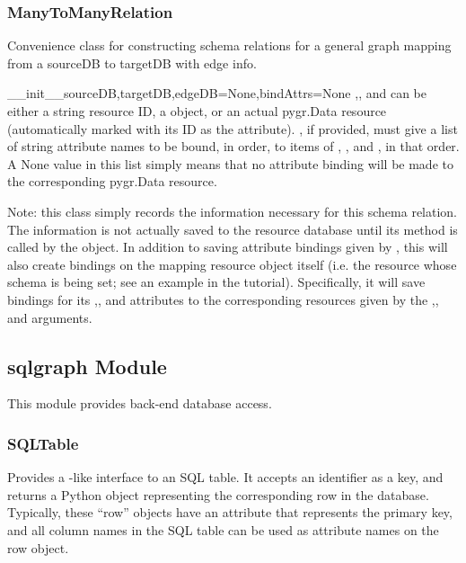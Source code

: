 \documentclass{howto}
\begin{document}
\subsubsection{ManyToManyRelation}
Convenience class for constructing schema relations for
a general graph mapping from a sourceDB to targetDB with edge info.
\begin{funcdesc}{__init__}{sourceDB,targetDB,edgeDB=None,bindAttrs=None}
  ,, and  can be either
  a string resource ID, a  object, or
  an actual pygr.Data resource (automatically marked with its ID
  as the  attribute).
  , if provided, must give a list of string attribute names to be
  bound, in order, to items of , ,
  and , in that order.  A None value in this list simply
  means that no attribute binding will be made to the corresponding
  pygr.Data resource.
\end{funcdesc}
Note: this class simply records the information necessary for this
schema relation.  The information is not actually saved to the resource
database until its  method is called by 
the  object.  In addition to saving attribute
bindings given by , this will also create bindings
on the mapping resource object itself (i.e. the resource whose
schema is being set; see an example in the tutorial).  Specifically,
it will save bindings for its ,,
and  attributes to the corresponding resources
given by the ,,
and  arguments.

\subsection{sqlgraph Module}
\label{sqlgraph-module}
This module provides back-end database access.

\subsubsection{SQLTable}
Provides a -like interface to an SQL table.  It accepts
an identifier as a key, and returns a Python object representing
the corresponding row in the database.  Typically, these ``row''
objects have an  attribute that represents the
primary key, and all column names in the SQL table can be
used as attribute names on the row object.
\end{document}
